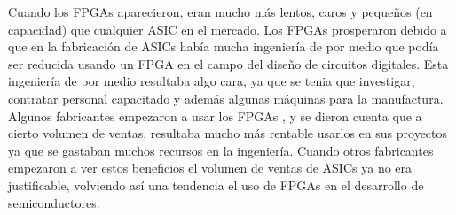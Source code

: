 \documentclass[twoside,spanish,ESP,MSc]{plantillaLabUPV}
\theoremstyle{definition}
\newcommand{\f}{FPGA }
\newcommand{\fs}{FPGAs }
\begin{document}


Cuando los \fs aparecieron, eran mucho más lentos, caros y pequeños (en capacidad) que cualquier ASIC en el mercado. Los \fs prosperaron debido a que en la fabricación de ASICs había mucha ingeniería de por medio que podía ser reducida usando un FPGA en el campo del diseño de circuitos digitales. Esta ingeniería de por medio resultaba algo cara, ya que se tenia que investigar, contratar personal capacitado y además algunas máquinas para la manufactura. Algunos fabricantes empezaron a usar los \fs, y se dieron cuenta que a cierto volumen de ventas, resultaba mucho más rentable usarlos en sus proyectos ya que se gastaban muchos recursos en la ingeniería. Cuando otros fabricantes empezaron a ver estos beneficios el volumen de ventas de ASICs ya no era justificable, volviendo así una tendencia el uso de FPGAs en el desarrollo de semiconductores.\\


\end{document}
